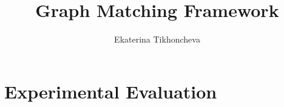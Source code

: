 \documentclass[
	fontsize=12pt,
	paper=a4,
	twoside=false,
	numbers=noenddot,
	plainheadsepline,
	toc=listof,
	toc=bibliography
]{scrartcl}
\begin{document}
\pagestyle{plain}

\title{Graph Matching Framework}
\author{Ekaterina Tikhoncheva}
\date{} 

\maketitle 



\section{Experimental Evaluation}
\end{document}
